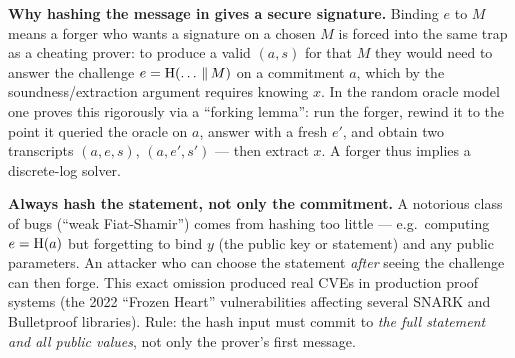 \begin{whybox}
\textbf{Why hashing the message in gives a secure signature.} Binding $e$ to $M$
means a forger who wants a signature on a chosen $M$ is forced into the same
trap as a cheating prover: to produce a valid $(a,s)$ for that $M$ they would
need to answer the challenge $e = \operatorname{H}(\dots\,\|\, M)$ on a commitment $a$,
which by the soundness/extraction argument requires knowing $x$. In the random
oracle model one proves this rigorously via a ``forking lemma'': run the forger,
rewind it to the point it queried the oracle on $a$, answer with a fresh $e'$,
and obtain two transcripts $(a,e,s)$, $(a,e',s')$ --- then extract $x$. A forger
thus implies a discrete-log solver.
\end{whybox}

\begin{trapbox}
\textbf{Always hash the statement, not only the commitment.} A notorious class
of bugs (``weak Fiat-Shamir'') comes from hashing too little --- e.g.\ computing
$e = \operatorname{H}(a)$ but forgetting to bind $y$ (the public key or statement) and any
public parameters. An attacker who can choose the statement \emph{after} seeing
the challenge can then forge. This exact omission produced real CVEs in
production proof systems (the 2022 ``Frozen Heart'' vulnerabilities affecting
several SNARK and Bulletproof libraries). Rule: the hash input must commit to
\emph{the full statement and all public values}, not only the prover's first
message.
\end{trapbox}

